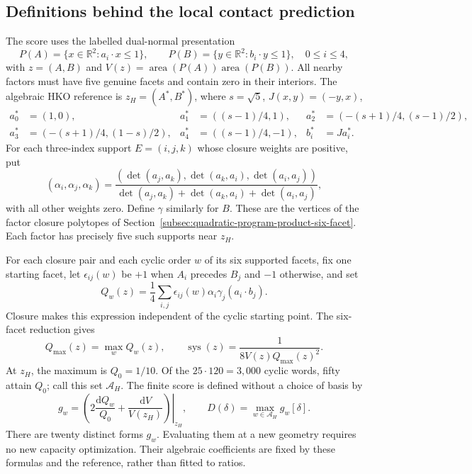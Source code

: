 \subsection{Definitions behind the local contact prediction}
\label{app:ds-local-contact-definitions}

The score uses the labelled dual-normal presentation
\[
 P(A)=\{x\in\mathbb R^2:a_i\cdot x\leq1\},\qquad
 P(B)=\{y\in\mathbb R^2:b_i\cdot y\leq1\},\quad 0\leq i\leq4,
\]
with $z=(A,B)$ and $V(z)=\operatorname{area}(P(A))
\operatorname{area}(P(B))$. All nearby factors must have five genuine
facets and contain zero in their interiors. The algebraic HKO reference is
$z_H=(A^*,B^*)$, where $s=\sqrt5$, $J(x,y)=(-y,x)$,
\begin{align*}
 a_0^*&=(1,0),&a_1^*&=((s-1)/4,1),&a_2^*&=(-(s+1)/4,(s-1)/2),\\
 a_3^*&=(-(s+1)/4,(1-s)/2),&a_4^*&=((s-1)/4,-1),&b_i^*&=Ja_i^*.
\end{align*}
For each three-index support $E=(i,j,k)$ whose closure weights are positive,
put
\[
 (\alpha_i,\alpha_j,\alpha_k)
 =\frac{(\det(a_j,a_k),\det(a_k,a_i),\det(a_i,a_j))}
 {\det(a_j,a_k)+\det(a_k,a_i)+\det(a_i,a_j)},
\]
with all other weights zero. Define $\gamma$ similarly for $B$.
These are the vertices of the factor closure polytopes of
Section~\ref{subsec:quadratic-program-product-six-facet}. Each factor
has precisely five such supports near $z_H$.

For each closure pair and each cyclic order $w$ of its six supported
facets, fix one starting facet, let $\epsilon_{ij}(w)$ be $+1$ when
$A_i$ precedes $B_j$ and $-1$ otherwise, and set
\[
 Q_w(z)=\frac14\sum_{i,j}\epsilon_{ij}(w)\alpha_i\gamma_j
                           (a_i\cdot b_j).
\]
Closure makes this expression independent of the cyclic starting point.
The six-facet reduction gives
\[
 Q_{\max}(z)=\max_w Q_w(z),\qquad
 \operatorname{sys}(z)=\frac1{8V(z)Q_{\max}(z)^2}.
\]
At $z_H$, the maximum is $Q_0=1/10$. Of the $25\cdot120=3,000$
cyclic words, fifty attain $Q_0$; call this set $\mathcal A_H$.
The finite score is defined without a choice of basis by
\[
 g_w=\left.\left(2\frac{\mathrm dQ_w}{Q_0}
                      +\frac{\mathrm dV}{V(z_H)}\right)\right|_{z_H},
 \qquad D(\delta)=\max_{w\in\mathcal A_H}g_w[\delta].
\]
There are twenty distinct forms $g_w$. Evaluating them at a new geometry
requires no new capacity optimization. Their algebraic coefficients are
fixed by these formulas and the reference, rather than fitted to ratios.

